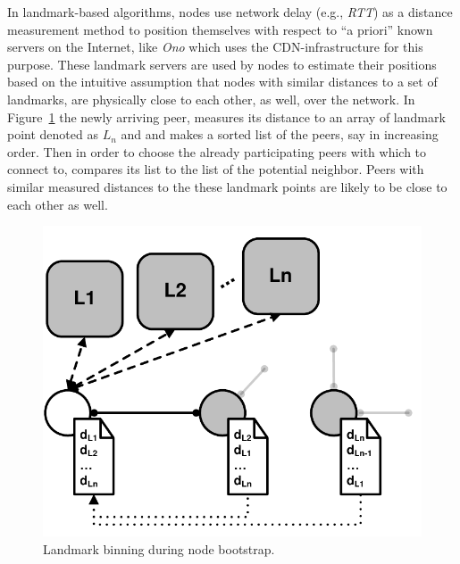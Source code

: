 In landmark-based algorithms, nodes use network delay (e.g., \emph{RTT}) as a
distance measurement method to position themselves with respect to ``a priori''
known servers on the Internet, like \emph{Ono} which uses the CDN-infrastructure
for this purpose.
These landmark servers are used
by nodes to estimate their positions based on the intuitive assumption that
nodes
with similar distances to a set of landmarks, are physically close to each
other, as well, over the network. 
In Figure~\ref{figure:landmarking} the newly
arriving peer, measures its distance to an array of landmark point denoted as
$L_n$ and and makes a sorted list of the peers, say in increasing order. Then in
order to choose the already participating peers with which to connect to,
compares its list to the list of the potential neighbor. Peers with similar
measured distances to the these landmark points are likely to be close to
each other as well.
\begin{figure}[ht]
\centering
  \includegraphics[scale=0.4]{img/pdf/landmarking.pdf}
\caption{Landmark binning during node bootstrap.}
\label{figure:landmarking}
\end{figure}

